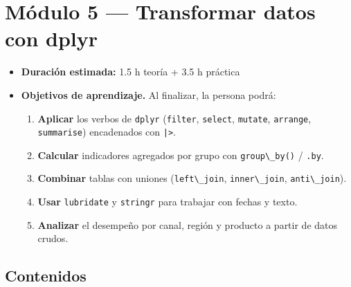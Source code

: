 \chapter{Módulo 5 --- Transformar datos con dplyr}

\begin{itemize}
\tightlist
\item
  \textbf{Duración estimada:} 1.5 h teoría + 3.5 h práctica
\item
  \textbf{Objetivos de aprendizaje.} Al finalizar, la persona podrá:

  \begin{enumerate}
  \def\labelenumi{\arabic{enumi}.}
  \tightlist
  \item
    \textbf{Aplicar} los verbos de \passthrough{\lstinline!dplyr!}
    (\passthrough{\lstinline!filter!}, \passthrough{\lstinline!select!},
    \passthrough{\lstinline!mutate!}, \passthrough{\lstinline!arrange!},
    \passthrough{\lstinline!summarise!}) encadenados con
    \passthrough{\lstinline!|>!}.
  \item
    \textbf{Calcular} indicadores agregados por grupo con
    \passthrough{\lstinline!group\_by()!} /
    \passthrough{\lstinline!.by!}.
  \item
    \textbf{Combinar} tablas con uniones
    (\passthrough{\lstinline!left\_join!},
    \passthrough{\lstinline!inner\_join!},
    \passthrough{\lstinline!anti\_join!}).
  \item
    \textbf{Usar} \passthrough{\lstinline!lubridate!} y
    \passthrough{\lstinline!stringr!} para trabajar con fechas y texto.
  \item
    \textbf{Analizar} el desempeño por canal, región y producto a partir
    de datos crudos.
  \end{enumerate}
\end{itemize}

\section{Contenidos}

